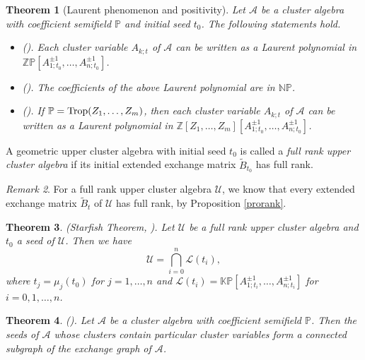 \documentclass{amsart}
\newtheorem{theorem}{Theorem}[section]
\theoremstyle{definition}
\theoremstyle{remark}
\newtheorem{remark}[theorem]{Remark}
\numberwithin{equation}{section}
\begin{document}
\begin{theorem}[Laurent phenomenon and  positivity] Let $\mathcal A$ be a cluster algebra with coefficient semifield $\mathbb P$ and initial seed $t_0$. The following statements hold.
\begin{itemize}
\item[(i)] {\rm (}\cite{FZ}{\rm ).} Each  cluster variable $A_{k;t}$ of $\mathcal A$ can be written as a  Laurent polynomial in $\mathbb {ZP}[A_{1;t_0}^{\pm1},\ldots,A_{n;t_0}^{\pm1}]$.

    \item[(ii)] {\rm (}\cite{GHKK}{\rm ).} The coefficients of the above Laurent polynomial are in $\mathbb{ NP}$.

    \item[(iii)] {\rm (}\cite{FZ1}{\rm ).} If  $\mathbb P={\rm Trop}(Z_1,\ldots,Z_m)$, then each cluster  variable $A_{k;t}$ of $\mathcal A$ can be written as a  Laurent polynomial in
$\mathbb Z[Z_1,\ldots,Z_m][A_{1;t_0}^{\pm1},\ldots,A_{n;t_0}^{\pm1}]$.
\end{itemize}
\end{theorem}


A geometric upper cluster algebra with initial seed $t_0$ is called a {\em full rank upper cluster algebra} if its initial extended exchange matrix $\widetilde B_{t_0}$ has full rank.

\begin{remark} For a full rank upper cluster algebra  $\mathcal U$, we know that every extended exchange matrix $\widetilde B_t$ of $\mathcal U$ has full rank, by  Proposition \ref{prorank}.
\end{remark}


\begin{theorem}{\rm (}Starfish Theorem, \cite[Corollary 1.9]{BFZ}{\rm ).} \label{proup}
Let $\mathcal U$  be a full rank upper cluster algebra and $t_0$ a seed of $\mathcal U$. Then we have $$\mathcal U=\bigcap\limits_{i=0}^n{\mathcal L}(t_i),$$ where $t_j=\mu_j(t_0)$ for $j=1,\ldots,n$ and ${\mathcal L}(t_i)=\mathbb{KP}[A_{1;t_i}^{\pm1},\ldots,A_{n;t_i}^{\pm1}]$ for $i=0,1,\ldots,n$.
\end{theorem}

\begin{theorem}\label{thmacon}
{\rm (}\cite[Theorem 10]{CL1}{\rm ).}
Let $\mathcal A$ be a cluster algebra with coefficient semifield $\mathbb P$. Then the seeds of  $\mathcal A$ whose clusters contain particular cluster variables form a connected subgraph of the exchange graph  of $\mathcal A$.
\end{theorem}
\end{document}
